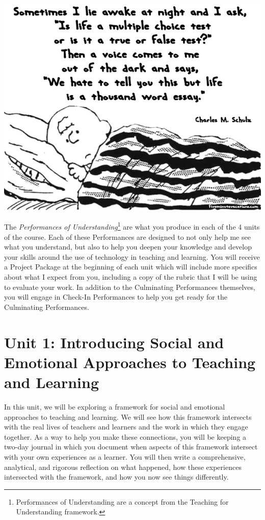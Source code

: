 \documentclass[two-side]{tufte-handout}
\begin{document}
\begin{marginfigure}%
	\begin{center}
		\includegraphics[width=1\linewidth]{lp-pic.png}
	\end{center}
\end{marginfigure}

 The \textit{Performances of Understanding}\footnote{Performances of Understanding are a concept from the Teaching for Understanding framework.} are what you produce in each of the 4 units of the course. Each of these Performances are designed to not only help me see what you understand, but also to help you deepen your knowledge and develop your skills around the use of technology in teaching and learning. You will receive a \textsf{Project Package} at the beginning of each unit which will include more specifics about what I expect from you, including a copy of the rubric that I will be using to evaluate your work. In addition to the Culminating Performances themselves, you will engage in Check-In Performances to help you get ready for the Culminating Performances.

\section{Unit 1:  Introducing Social and Emotional Approaches to Teaching and Learning}

In this unit, we will be exploring a framework for social and emotional approaches to teaching and learning. We will see how this framework intersects with the real lives of teachers and learners and the work in which they engage together. As a way to help you make these connections, you will be keeping a two-day journal in which you document when aspects of this framework intersect with your own experiences as a learner. You will then write a comprehensive, analytical, and rigorous reflection on what happened, how these experiences intersected with the framework, and how you now see things differently.
\end{document}
